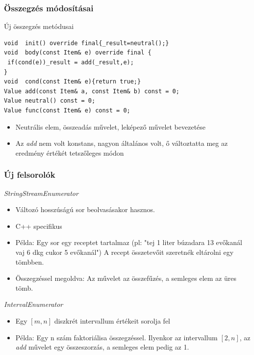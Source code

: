 \documentclass[11pt]{beamer}
\begin{document}
\begin{frame}[fragile]
	\frametitle{Összegzés módosításai}
	\begin{block}{Új összegzés metódusai}
	\begin{lstlisting}[basicstyle=\small]
void  init() override final{_result=neutral();}
void  body(const Item& e) override final {
 if(cond(e))_result = add(_result,e);
}
void  cond(const Item& e){return true;}
Value add(const Item& a, const Item& b) const = 0;
Value neutral() const = 0;
Value func(const Item& e) const = 0;

	\end{lstlisting}
	\end{block}
	
	\begin{itemize}
	\item Neutrális elem, összeadás művelet, leképező művelet bevezetése
	\item Az \textit{add} nem volt konstans, nagyon általános volt, ő változtatta meg az eredmény értékét tetszőleges módon
	\end{itemize}
\end{frame}

\begin{frame}
	\frametitle{Új felsorolók}
		 \textit{StringStreamEnumerator} 
		 \begin{itemize}
		 	\item Változó hosszúságú sor beolvasásakor hasznos.
		 	\item C++ specifikus
		 	\item Példa: Egy sor egy receptet tartalmaz (pl: "tej 1 liter búzadara 13 evőkanál vaj 6 dkg cukor 5 evőkanál") A recept összetevőit szeretnék eltárolni egy tömbben.
		 	\item Összegzéssel megoldva: Az  művelet az összefűzés, a semleges elem az üres tömb.
		 \end{itemize}
		
		\textit{IntervalEnumerator}
		\begin{itemize}
			\item Egy $[m,n]$ diszkrét intervallum értékeit sorolja fel
			\item Példa: Egy n szám faktoriálisa összegzéssel. Ilyenkor az intervallum $[2,n]$, az \textit{add} művelet egy összeszorzás, a semleges elem pedig az 1.
		\end{itemize}
		
\end{frame}
\end{document}

